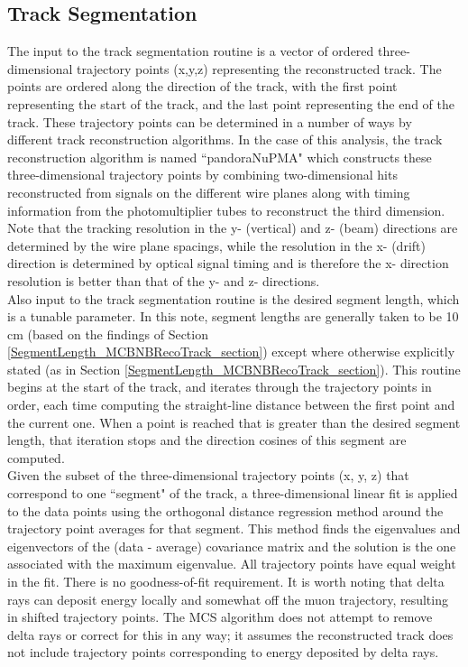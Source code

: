 \subsection{Track Segmentation}\label{track_segmentation_section}
The input to the track segmentation routine is a vector of ordered three-dimensional trajectory points (x,y,z) representing the reconstructed track. The points are ordered along the direction of the track, with the first point representing the start of the track, and the last point representing the end of the track. These trajectory points can be determined in a number of ways by different track reconstruction algorithms. In the case of this analysis, the track reconstruction algorithm is named ``pandoraNuPMA" which constructs these three-dimensional trajectory points by combining two-dimensional hits reconstructed from signals on the different wire planes along with timing information from the photomultiplier tubes to reconstruct the third dimension\cite{Marshall:2015rfa}. Note that the tracking resolution in the y- (vertical) and z- (beam) directions are determined by the wire plane spacings, while the resolution in the x- (drift) direction is determined by optical signal timing and is therefore the x- direction resolution is better than that of the y- and z- directions.\\

Also input to the track segmentation routine is the desired segment length, which is a tunable parameter. In this note, segment lengths are generally taken to be 10 cm (based on the findings of Section \ref{SegmentLength_MCBNBRecoTrack_section}) except where otherwise explicitly stated (as in Section \ref{SegmentLength_MCBNBRecoTrack_section}). This routine begins at the start of the track, and iterates through the trajectory points in order, each time computing the straight-line distance between the first point and the current one. When a point is reached that is greater than the desired segment length, that iteration stops and the direction cosines of this segment are computed.\\

Given the subset of the three-dimensional trajectory points (x, y, z) that correspond to one ``segment" of the track, a three-dimensional linear fit is applied to the data points using the orthogonal distance regression method around the trajectory point averages for that segment. This method finds the eigenvalues and eigenvectors of the (data - average) covariance matrix and the solution is the one associated with the maximum eigenvalue. All trajectory points have equal weight in the fit. There is no goodness-of-fit requirement. It is worth noting that delta rays can deposit energy locally and somewhat off the muon trajectory, resulting in shifted trajectory points. The MCS algorithm does not attempt to remove delta rays or correct for this in any way; it assumes the reconstructed track does not include trajectory points corresponding to energy deposited by delta rays. \\

